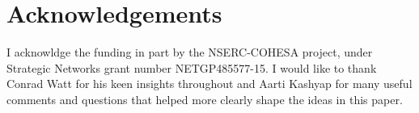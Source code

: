 
\section*{Acknowledgements}
I acknowldge the funding in part by the NSERC-COHESA project, under Strategic Networks grant number NETGP485577-15.
I would like to thank Conrad Watt for his keen insights throughout
and Aarti Kashyap for many useful comments and questions that helped more clearly shape the ideas in this paper. 